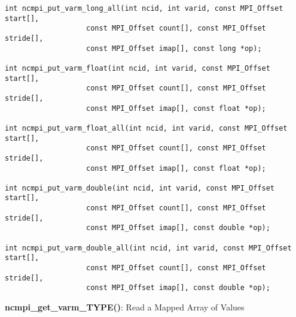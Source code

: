 \begin{verbatim}
int ncmpi_put_varm_long_all(int ncid, int varid, const MPI_Offset start[],
                   const MPI_Offset count[], const MPI_Offset stride[],
                   const MPI_Offset imap[], const long *op); 

int ncmpi_put_varm_float(int ncid, int varid, const MPI_Offset start[],
                   const MPI_Offset count[], const MPI_Offset stride[],
                   const MPI_Offset imap[], const float *op); 

int ncmpi_put_varm_float_all(int ncid, int varid, const MPI_Offset start[],
                   const MPI_Offset count[], const MPI_Offset stride[],
                   const MPI_Offset imap[], const float *op); 

int ncmpi_put_varm_double(int ncid, int varid, const MPI_Offset start[],
                   const MPI_Offset count[], const MPI_Offset stride[],
                   const MPI_Offset imap[], const double *op); 

int ncmpi_put_varm_double_all(int ncid, int varid, const MPI_Offset start[],
                   const MPI_Offset count[], const MPI_Offset stride[],
                   const MPI_Offset imap[], const double *op); 
\end{verbatim}


{\bf ncmpi\_get\_varm\_TYPE()}: Read a Mapped Array of Values


